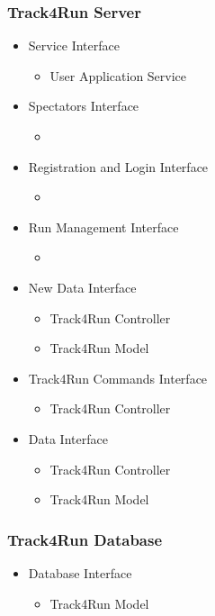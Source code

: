 \documentclass[../../DD.tex]{subfiles}
\begin{document}
		\subsubsection{Track4Run Server}
		\begin{itemize}
			\item Service Interface
			\begin{itemize}
				\item User Application Service 
			\end{itemize}
			\item Spectators Interface
			\begin{itemize}
				\item {}
			\end{itemize}
			\item Registration and Login Interface
			\begin{itemize}
				\item {}
			\end{itemize}
			\item Run Management Interface
			\begin{itemize}
				\item {}
			\end{itemize}
			\item New Data Interface
			\begin{itemize}
				\item Track4Run Controller
				\item Track4Run Model
			\end{itemize}
			\item Track4Run Commands Interface
			\begin{itemize}
				\item Track4Run Controller
			\end{itemize}
			\item Data Interface
			\begin{itemize}
				\item Track4Run Controller
				\item Track4Run Model
			\end{itemize}
		\end{itemize}

		\subsubsection{Track4Run Database}
		\begin{itemize}
			\item Database Interface
			\begin{itemize}
				\item Track4Run Model
			\end{itemize}
		\end{itemize}
\end{document}
